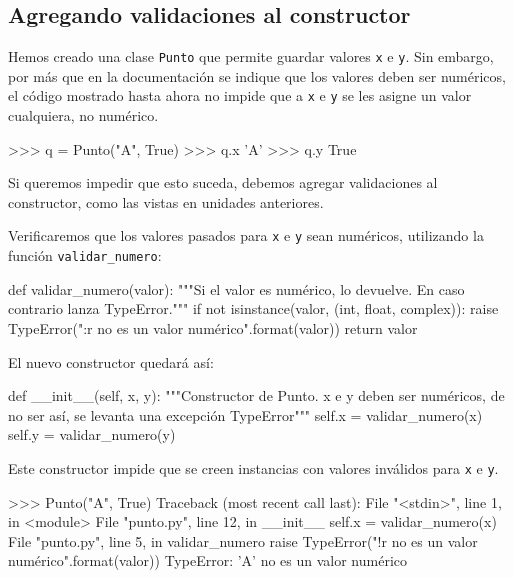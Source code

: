 \subsection{Agregando validaciones al constructor}

Hemos creado una clase \lstinline!Punto! que permite guardar valores
\lstinline!x! e \lstinline!y!.  Sin embargo, por más que en la
documentación se indique que los valores deben ser numéricos, el código
mostrado hasta ahora no impide que a \lstinline!x! e \lstinline!y! se les
asigne un valor cualquiera, no numérico.

\begin{codigo-python-sn}
>>> q = Punto("A", True)
>>> q.x
'A'
>>> q.y
True
\end{codigo-python-sn}

Si queremos impedir que esto suceda, debemos agregar validaciones al
constructor, como las vistas en unidades anteriores.

Verificaremos que los valores pasados para \lstinline!x! e \lstinline!y!
sean numéricos, utilizando la función \lstinline!validar_numero!:

\begin{codigo-python-sn}
def validar_numero(valor):
    """Si el valor es numérico, lo devuelve.
       En caso contrario lanza TypeError."""
    if not isinstance(valor, (int, float, complex)):
        raise TypeError("{:r} no es un valor numérico".format(valor))
    return valor
\end{codigo-python-sn}

El nuevo constructor quedará así:

\begin{codigo-python-sn}
    def __init__(self, x, y):
        """Constructor de Punto. x e y deben ser numéricos,
           de no ser así, se levanta una excepción TypeError"""
        self.x = validar_numero(x)
        self.y = validar_numero(y)
\end{codigo-python-sn}

Este constructor impide que se creen instancias con valores inválidos para
\lstinline!x! e \lstinline!y!.

\begin{codigo-python-sn}
>>> Punto("A", True)
Traceback (most recent call last):
  File "<stdin>", line 1, in <module>
  File "punto.py", line 12, in __init__
    self.x = validar_numero(x)
  File "punto.py", line 5, in validar_numero
    raise TypeError("{!r} no es un valor numérico".format(valor))
TypeError: 'A' no es un valor numérico
\end{codigo-python-sn}

